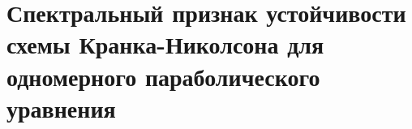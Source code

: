 \documentclass[__main__.tex]{subfiles}
\begin{document}
\section{Спектральный признак устойчивости схемы Кранка-Николсона для одномерного параболического уравнения}
\end{document}
